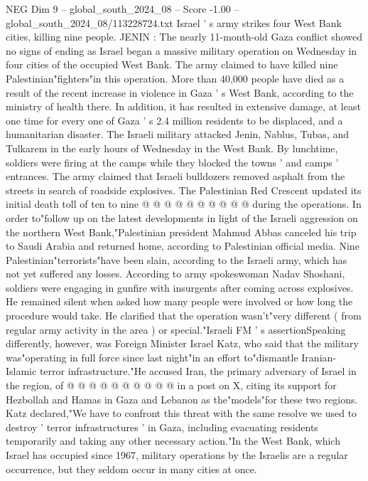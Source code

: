 \begin{textsample}{NEG Dim 9 – global\_south\_2024\_08 – Score -1.00 – global\_south\_2024\_08/113228724.txt}  \label{ex:f9_neg_344}
Israel ' s army strikes four West Bank cities, killing nine people.
JENIN : The nearly 11-month-old Gaza conflict showed no signs of ending as Israel began a massive military operation on Wednesday in four cities of the occupied West Bank.
The army claimed to have killed nine Palestinian"fighters"in this operation.
More than 40,000 people have died as a result of the recent increase in violence in Gaza ' s West Bank, according to the ministry of health there.
In addition, it has resulted in extensive damage, at least one time for every one of Gaza ' s 2.4 million residents to be displaced, and a humanitarian disaster.
The Israeli military attacked Jenin, Nablus, Tubas, and Tulkarem in the early hours of Wednesday in the West Bank.
By lunchtime, soldiers were firing at the camps while they blocked the towns ' and camps ' entrances.
The army claimed that Israeli bulldozers removed asphalt from the streets in search of roadside explosives.
The Palestinian Red Crescent updated its initial death toll of ten to nine @ @ @ @ @ @ @ @ @ @ during the operations.
In order to"follow up on the latest developments in light of the Israeli aggression on the northern West Bank,"Palestinian president Mahmud Abbas canceled his trip to Saudi Arabia and returned home, according to Palestinian official media.
Nine Palestinian"terrorists"have been slain, according to the Israeli army, which has not yet suffered any losses.
According to army spokeswoman Nadav Shoshani, soldiers were engaging in gunfire with insurgents after coming across explosives.
He remained silent when asked how many people were involved or how long the procedure would take.
He clarified that the operation wasn't"very different ( from regular army activity in the area ) or special."Israeli FM ' s assertionSpeaking differently, however, was Foreign Minister Israel Katz, who said that the military was"operating in full force since last night"in an effort to"dismantle Iranian-Islamic terror infrastructure."He accused Iran, the primary adversary of Israel in the region, of @ @ @ @ @ @ @ @ @ @ in a post on X, citing its support for Hezbollah and Hamas in Gaza and Lebanon as the"models"for these two regions.
Katz declared,"We have to confront this threat with the same resolve we used to destroy ' terror infrastructures ' in Gaza, including evacuating residents temporarily and taking any other necessary action."In the West Bank, which Israel has occupied since 1967, military operations by the Israelis are a regular occurrence, but they seldom occur in many cities at once.

\end{textsample}
